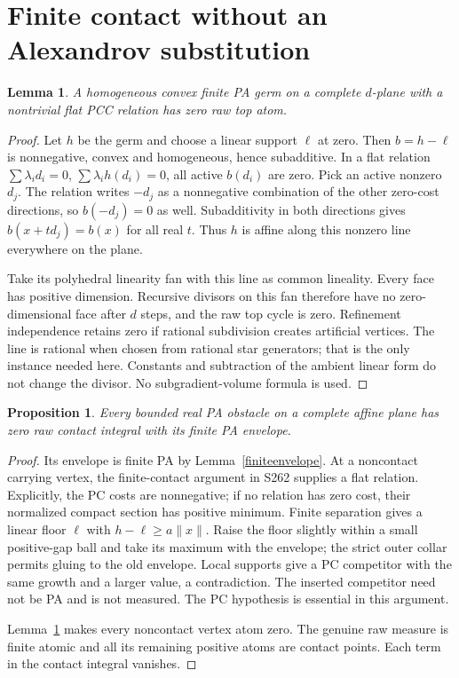 \documentclass[11pt]{article}
\newtheorem{lemma}[theorem]{Lemma}
\newtheorem{proposition}[theorem]{Proposition}
\begin{document}
\section{Finite contact without an Alexandrov substitution}
\begin{lemma}\label{flatline}
A homogeneous convex finite PA germ on a complete $d$-plane with a
nontrivial flat PCC relation has zero raw top atom.
\end{lemma}
\begin{proof}
Let $h$ be the germ and choose a linear support $\ell$ at zero.
Then $b=h-\ell$ is nonnegative, convex and homogeneous, hence
subadditive. In a flat relation
$\sum\lambda_i d_i=0$, $\sum\lambda_i h(d_i)=0$,
all active $b(d_i)$ are zero. Pick an active nonzero $d_j$.
The relation writes $-d_j$ as a nonnegative combination of the
other zero-cost directions, so $b(-d_j)=0$ as well. Subadditivity
in both directions gives $b(x+t d_j)=b(x)$ for all real $t$.
Thus $h$ is affine along this nonzero line everywhere on the plane.

Take its polyhedral linearity fan with this line as common lineality.
Every face has positive dimension. Recursive divisors on this fan
therefore have no zero-dimensional face after $d$ steps, and the raw
top cycle is zero. Refinement independence retains zero if rational
subdivision creates artificial vertices. The line is rational when
chosen from rational star generators; that is the only instance
needed here. Constants and subtraction of the ambient linear form
do not change the divisor. No subgradient-volume formula is used.
\end{proof}

\begin{proposition}\label{finitecontact}
Every bounded real PA obstacle on a complete affine plane has zero
raw contact integral with its finite PA envelope.
\end{proposition}
\begin{proof}
Its envelope is finite PA by Lemma~\ref{finiteenvelope}. At a
noncontact carrying vertex, the finite-contact argument in S262
supplies a flat relation. Explicitly, the PC costs are nonnegative;
if no relation has zero cost, their normalized compact section has
positive minimum. Finite separation gives a linear floor $\ell$
with $h-\ell\geq a\|x\|$. Raise the floor slightly within a small
positive-gap ball and take its maximum with the envelope; the strict
outer collar permits gluing to the old envelope. Local supports give
a PC competitor with the same growth and a larger value, a
contradiction. The inserted competitor need not be PA and is not
measured. The PC hypothesis is essential in this argument.

Lemma~\ref{flatline} makes every noncontact vertex atom zero. The
genuine raw measure is finite atomic and all its remaining positive
atoms are contact points. Each term in the contact integral vanishes.
\end{proof}
\end{document}

